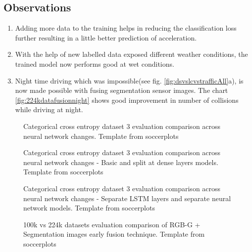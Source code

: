 \subsection*{Observations}
\begin{enumerate}
    \item Adding more data to the training helps in reducing the classification loss
        further resulting in a little better prediction of acceleration.
    \item With the help of new labelled data exposed different weather conditions, the
        trained model now performs good at wet conditions.
    \item Night time driving which was impossible(see fig. \ref{fig:dsvslcvstrafficAll}a),
        is now made possible with fusing segmentation sensor images. The chart
        \ref{fig:224kdatafusionnight} shows good improvement in number of collisions
        while driving at night.
\end{enumerate}
\begin{figure}[!ht]
    \centering
    \def\svgwidth{\textwidth}
    
    \caption{Categorical cross entropy dataset 3 evaluation comparison across neural
    network changes. Template from soccerplots\cite{soccerplots}}
    \label{fig:radarccecompare}
\end{figure}
\begin{figure}[!ht]
    \centering
    \def\svgwidth{0.8\textwidth}
    
    \caption{Categorical cross entropy dataset 3 evaluation comparison across neural
    network changes - Basic and split at dense layers models. Template from soccerplots\cite{soccerplots}}
    \label{fig:radarccecompare1}
\end{figure}
\begin{figure}[!ht]
    \centering
    \def\svgwidth{0.8\textwidth}
    
    \caption{Categorical cross entropy dataset 3 evaluation comparison across neural
    network changes - Separate LSTM layers and separate neural network models. Template from soccerplots\cite{soccerplots}}
    \label{fig:radarccecompare2}
\end{figure}
\begin{figure}[!ht]
    \centering
    \def\svgwidth{0.8\textwidth}
    
    \caption{100k vs 224k datasets evaluation comparison of RGB-G + Segmentation images
    early fusion technique. Template from soccerplots\cite{soccerplots}}
    \label{fig:radar100kvs224k}
\end{figure}
